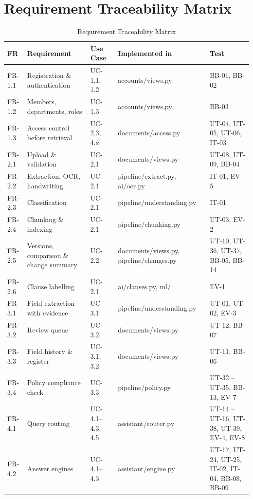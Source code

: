 \section{Requirement Traceability Matrix}
\begin{table}[H]\centering
\caption{Requirement Traceability Matrix}\label{tab:rtm}
\small
\begin{tabularx}{\textwidth}{|p{1.3cm}|X|p{1.9cm}|p{3.4cm}|p{2.6cm}|}\hline
\textbf{FR} & \textbf{Requirement} & \textbf{Use Case} & \textbf{Implemented in} & \textbf{Test} \\ \hline
FR-1.1 & Registration \& authentication & UC-1.1, 1.2 & accounts/views.py & BB-01, BB-02 \\ \hline
FR-1.2 & Members, departments, roles & UC-1.3 & accounts/views.py & BB-03 \\ \hline
FR-1.3 & Access control before retrieval & UC-2.3, 4.x & documents/access.py & UT-04, UT-05, UT-06, IT-03 \\ \hline
FR-2.1 & Upload \& validation & UC-2.1 & documents/views.py & UT-08, UT-09, BB-04 \\ \hline
FR-2.2 & Extraction, OCR, handwriting & UC-2.1 & pipeline/\allowbreak{}extract.py, ai/ocr.py & IT-01, EV-5 \\ \hline
FR-2.3 & Classification & UC-2.1 & pipeline/\allowbreak{}understanding.py & IT-01 \\ \hline
FR-2.4 & Chunking \& indexing & UC-2.1 & pipeline/chunking.py & UT-03, EV-2 \\ \hline
FR-2.5 & Versions, comparison \& change summary & UC-2.2 & documents/views.py, pipeline/changes.py & UT-10, UT-36, UT-37, BB-05, BB-14 \\ \hline
FR-2.6 & Clause labelling & UC-2.1 & ai/clauses.py, ml/ & EV-1 \\ \hline
FR-3.1 & Field extraction with evidence & UC-3.1 & pipeline/\allowbreak{}understanding.py & UT-01, UT-02, EV-3 \\ \hline
FR-3.2 & Review queue & UC-3.2 & documents/views.py & UT-12, BB-07 \\ \hline
FR-3.3 & Field history \& register & UC-3.1, 3.2 & documents/views.py & UT-11, BB-06 \\ \hline
FR-3.4 & Policy compliance check & UC-3.3 & pipeline/policy.py & UT-32 -- UT-35, BB-13, EV-7 \\ \hline
FR-4.1 & Query routing & UC-4.1--4.3, 4.5 & assistant/router.py & UT-14 -- UT-16, UT-38, UT-39, EV-4, EV-8 \\ \hline
FR-4.2 & Answer engines & UC-4.1--4.3 & assistant/engine.py & UT-17, UT-24, UT-25, IT-02, IT-04, BB-08, BB-09 \\ \hline

\end{tabularx}
\end{table}
